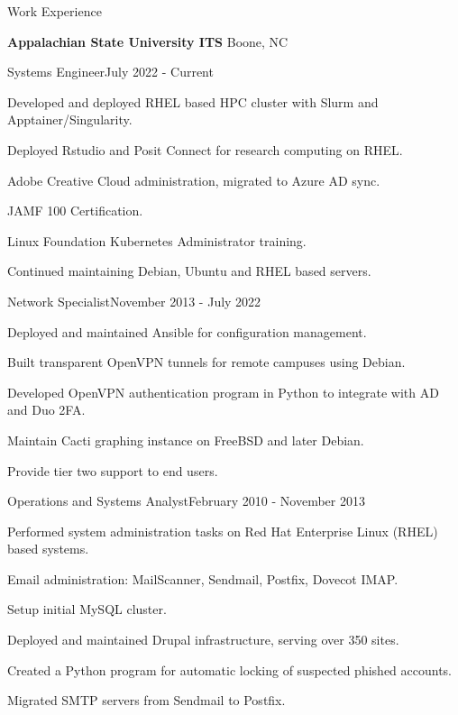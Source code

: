 \documentclass{new_cv} %
\begin{document}
\begin{rSection}{Work Experience}
	
 {\bf  {Appalachian State University ITS}} \hfill {Boone, NC}
 
   \begin{rSubsection}{Systems Engineer}{July 2022 - Current}
	\item Developed and deployed RHEL based HPC cluster with Slurm and Apptainer/Singularity.
	\item Deployed Rstudio and Posit Connect for research computing on RHEL.
 	\item Adobe Creative Cloud administration, migrated to Azure AD sync.
 	\item JAMF 100 Certification.
 	\item Linux Foundation Kubernetes Administrator training.
 	\item Continued maintaining Debian, Ubuntu and RHEL based servers.
 \end{rSubsection}

      \begin{rSubsection}{Network Specialist}{November 2013 - July 2022}
		\item Deployed and maintained Ansible for configuration management.
		\item Built transparent OpenVPN tunnels for remote campuses using Debian.
		\item Developed OpenVPN authentication program in Python to integrate with AD and Duo 2FA.
		\item Maintain Cacti graphing instance on FreeBSD and later Debian.
        \item Provide tier two support to end users.
      \end{rSubsection}
      
      \begin{rSubsection}{Operations and Systems Analyst}{February 2010 - November 2013}
		\item Performed system administration tasks on Red Hat Enterprise Linux (RHEL) based systems.
		\item Email administration: MailScanner, Sendmail, Postfix, Dovecot IMAP. 
		\item Setup initial MySQL cluster.
		\item Deployed and maintained Drupal infrastructure, serving over 350 sites.
		\item Created a Python program for automatic locking of suspected phished accounts.
		\item Migrated SMTP servers from Sendmail to Postfix.
       \end{rSubsection}
     

\end{rSection}
\end{document}
